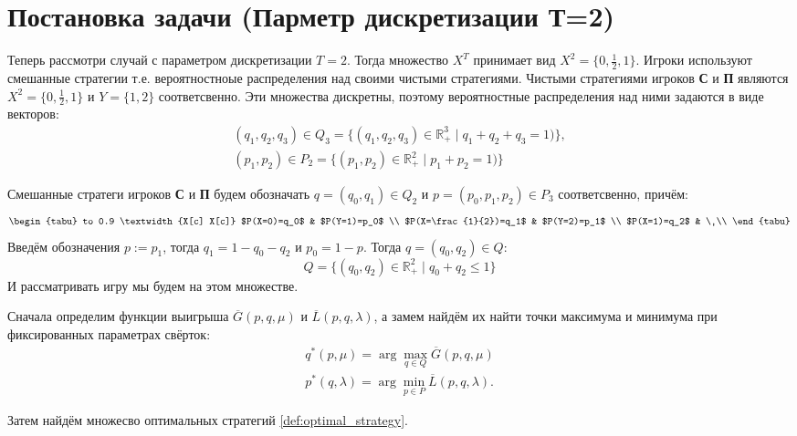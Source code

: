 \section{Постановка задачи (Парметр дискретизации Т=2)}

Теперь рассмотри случай с параметром дискретизации $T=2$. Тогда множество 
$X^T$ принимает вид $X^2=\{0, \frac{1}{2}, 1\}$.
Игроки используют смешанные стратегии т.е. вероятностноые распределения над 
своими чистыми стратегиями.
Чистыми стратегиями игроков \textbf{С} и \textbf{П} являются 
$X^2=\{0, \frac{1}{2}, 1\}$ и $Y=\{1,2\}$ соответсвенно. 
Эти множества дискретны, поэтому вероятностные
распределения над ними задаются в виде векторов: 
\begin{gather*}
	(q_1, q_2, q_3) \in Q_3 = \{
		(q_1, q_2, q_3) \in \mathbb{R}_+^3 \; | \; q_1 + q_2 + q_3 = 1)
	\},
	\\
	(p_1, p_2) \in P_2 = \{
		(p_1, p_2) \in \mathbb{R}_+^2 \; | \; p_1 + p_2 = 1)
	\}
\end{gather*}

Смешанные стратеги игроков \textbf{С} и \textbf{П} будем обозначать
$q=(q_0,q_1) \in Q_2$ и $p=(p_0, p_1, p_2) \in P_3$ соответсвенно, причём:
\begin{equation}
\begin{tabu} to 0.9 \textwidth {X[c] X[c]}
	$P(X=0)=q_0$ & $P(Y=1)=p_0$ \\
	$P(X=\frac{1}{2})=q_1$ & $P(Y=2)=p_1$ \\
	$P(X=1)=q_2$ & \
	\\
	\end{tabu}	
\label{eq:probability_1}
\end{equation}
Введём обозначения $p := p_1$, тогда $q_1 = 1 - q_0 - q_2$ и $p_0 = 1 - p$. 
Тогда $q=(q_0, q_2) \in Q$:
$$
	Q = \{
		(q_0,q_2) \in \mathbb{R}^2_{+} \; | \;
		q_0 + q_2 \leqslant 1
	\}	
$$
И рассматривать игру мы будем на этом множестве.

Сначала определим функции выигрыша $\overline G(p, q, \mu)$
и $\overline L(p, q, \lambda)$, а замем найдём их
найти точки максимума и минимума при фиксированных параметрах
свёрток:
\begin{gather*}
	q^*(p, \mu) = \arg \max \limits_{q \in Q} \overline G(p, q, \mu)
	\\	
	p^*(q, \lambda) = \arg \min \limits_{p \in P} \overline L(p, q, \lambda).
\end{gather*}

Затем найдём множесво оптимальных стратегий \eqref{def:optimal_strategy}.
